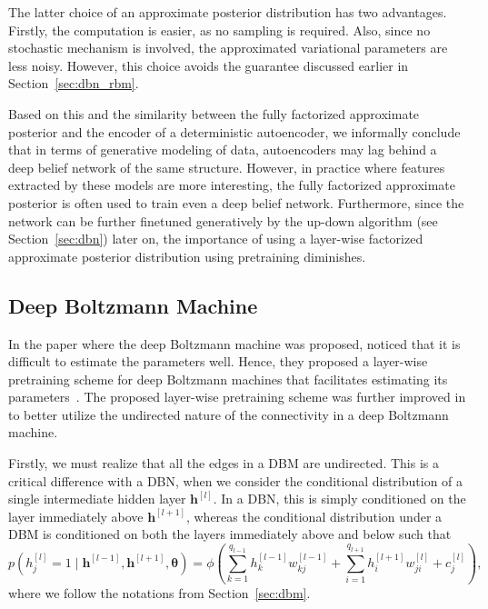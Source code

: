 \documentclass{now}
\newcommand{\qlay}[1]{\left[#1\right]}
\newcommand{\vect}[1]{\mathbf{#1}}
\newcommand{\vects}[1]{\boldsymbol{#1}}
\newcommand{\vh}[0]{\vect{h}}
\newcommand{\TT}[0]{{\vects{\theta}}}
\begin{document}
The latter choice of an approximate posterior distribution has two advantages.
Firstly, the computation is easier, as no sampling is required. Also, since no
stochastic mechanism is involved, the approximated variational parameters are
less noisy. However, this choice avoids the guarantee discussed earlier in
Section~\ref{sec:dbn_rbm}.

Based on this and the similarity between the fully factorized approximate
posterior and the encoder of a deterministic autoencoder, we informally conclude
that in terms of generative modeling of data, autoencoders may lag behind a deep
belief network of the same structure. However, in practice where features
extracted by these models are more interesting, the fully factorized approximate
posterior is often used to train even a deep belief network.  Furthermore, since
the network can be further finetuned generatively by the up-down algorithm (see
Section~\ref{sec:dbn}) later on, the importance of using a layer-wise factorized
approximate posterior distribution using pretraining diminishes.



\subsection{Deep Boltzmann Machine}
\label{sec:dbm_pre}

In the paper where the deep Boltzmann machine was proposed,
\citet{Salakhutdinov2009a} noticed that it is difficult to estimate the
parameters well. Hence, they proposed a layer-wise pretraining scheme for deep
Boltzmann machines that facilitates estimating its
parameters~\citep{Salakhutdinov2012nc}. The proposed layer-wise pretraining
scheme was further improved in \citep{Salakhutdinov2012} to better utilize the
undirected nature of the connectivity in a deep Boltzmann machine.

Firstly, we must realize that all the edges in a DBM are undirected.  This is a
critical difference with a DBN, when we consider the conditional distribution of
a single intermediate hidden layer $\vh^{\qlay{l}}$. In a DBN, this is simply
conditioned on the layer immediately above $\vh^{\qlay{l+1}}$, whereas the
conditional distribution under a DBM is conditioned on both the layers
immediately above and below such that
\[
p(h^{\qlay{l}}_j = 1 \mid \vh^{\qlay{l-1}}, \vh^{\qlay{l+1}}, \TT) = \phi\left(
\sum_{k=1}^{q_{l-1}} h^{\qlay{l-1}}_k w_{kj}^{\qlay{l-1}} +
\sum_{i=1}^{q_{l+1}} h^{\qlay{l+1}}_i w_{ji}^{\qlay{l}} +
c_j^{\qlay{l}}
\right),
\]
where we follow the notations from Section~\ref{sec:dbm}.
\end{document}
